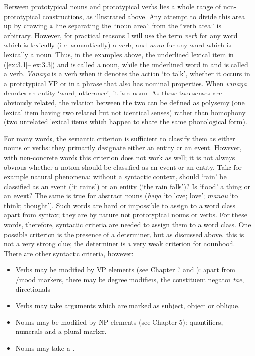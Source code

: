 Between prototypical nouns and prototypical verbs lies a whole range of non-prototyp\-i\-cal constructions, as illustrated above. Any attempt to divide this area up by drawing a line separating the “noun area” from the “verb area” is arbitrary. However, for practical reasons I will use the term \textit{verb} for any word which is lexically (i.e. semantically) a verb, and \textit{noun} for any word which is lexically a noun. Thus, in the examples above, the underlined lexical item in (\ref{ex:3.1}–\ref{ex:3.3}) and  is called a noun, while the underlined word in  and  is called a verb. \textit{Vānaŋa} is a verb when it denotes the action ‘to talk’, whether it occurs in a prototypical VP or in a phrase that also has nominal properties. When \textit{vānaŋa} denotes an entity ‘word, utterance’, it is a noun. As these two senses are obviously related, the relation between the two can be defined as polysemy (one lexical item having two related but not identical senses) rather than homophony (two unrelated lexical items which happen to share the same phonological form). 

For many words, the semantic criterion is sufficient to classify them as either nouns or verbs: they primarily designate either an entity or an event. However, with non-concrete words this criterion does not work as well; it is not always obvious whether a notion should be classified as an event or an entity. Take for example natural phenomena: without a syntactic context, should ‘rain’ be classified as an event (‘it rains’) or an entity (‘the rain falls’)? Is ‘flood’ a thing or an event? The same is true for abstract nouns (\textit{haŋa} ‘to love; love’; \textit{mana{\ꞌ}u} ‘to think; thought’). Such words are hard or impossible to assign to a word class apart from syntax; they are by nature not prototypical nouns or verbs. For these words, therefore, syntactic criteria are needed to assign them to a word class. One possible criterion is the presence of a determiner, but as discussed above, this is not a very strong clue; the determiner is a very weak criterion for nounhood. There are other syntactic criteria, however:

\begin{itemize}
\item 
Verbs may be modified by VP elements (see Chapter 7 and ): apart from /mood markers, there may be degree modifiers, the constituent negator \textit{ta{\ꞌ}e}, directionals.

\item 
Verbs may take arguments which are marked as subject, object or oblique.

\item 
Nouns may be modified by NP elements (see Chapter 5): quantifiers, numerals and a plural marker.

\item 
Nouns may take a .

\end{itemize}

